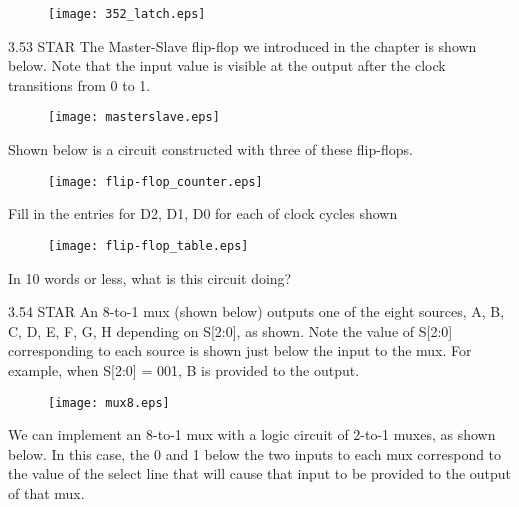 \documentclass{patt}
\begin{document}
\begin{exercises}
\begin{figure}[h]
\begin{center}
\texttt{[image: 352\_latch.eps]}
\end{center}
\end{figure}

\item[3.53]STAR The Master-Slave flip-flop we introduced in the chapter is shown below. Note that the input value is visible at the output after the clock transitions
from 0 to 1.\\

\begin{figure}[h]
\centering
\texttt{[image: masterslave.eps]}
\end{figure}

\noindent
Shown below is a circuit constructed with three of these flip-flops.\\

\begin{figure}[h]
\centering
\texttt{[image: flip-flop\_counter.eps]}
\end{figure}

Fill in the entries for D2, D1, D0 for each of clock cycles shown
\noindent
\hspace{2.0in}
\begin{figure}[h]
\centering
\texttt{[image: flip-flop\_table.eps]}
\end{figure}

\noindent
In 10 words or less, what is this circuit doing?\\

\item[3.54]STAR An 8-to-1 mux (shown below) outputs one of the
eight sources, A, B, C, D, E, F, G, H depending on S[2:0], as shown.  Note
the value of S[2:0] corresponding to each source is shown just below
the input to the mux.  For example, when S[2:0] = 001, B is provided to the
output.

\vspace{0.1in}
\begin{figure}[h]
\centering
\texttt{[image: mux8.eps]}
\end{figure}

\noindent We can implement an 8-to-1 mux with a logic circuit of 2-to-1 muxes,
as shown below.  In this case, the 0 and 1 below the two inputs to each
mux correspond to the value of the select line that will cause that input
to be provided to the output of that mux.\\



\end{exercises}
\end{document}
